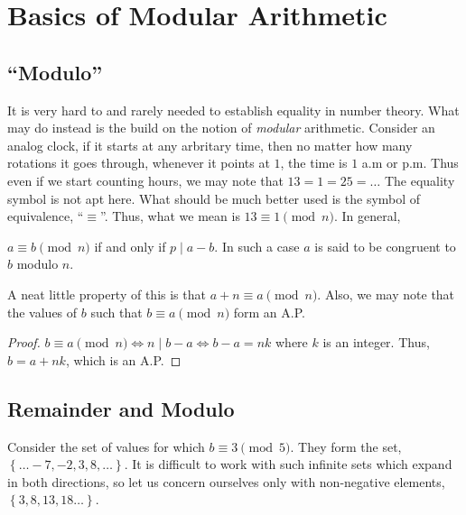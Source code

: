 \chapter{Basics of Modular Arithmetic}
\label{nt: modbasic}

\section{``Modulo''}

It is very hard to and rarely needed to establish equality in number theory. What may do instead
is the build on the notion of \emph{modular} arithmetic. Consider an analog clock, if it starts
at any arbritary time, then no matter how many rotations it goes through, whenever it points at 
\(1\), the time is \(1\) a.m or p.m. Thus even if we start counting hours, we may note that
\(13 = 1 = 25 = \dots\)                                                                                                                                                                                       
\parbreak
The equality symbol is not apt here. What should be much better used is the symbol of equivalence,
``\(\equiv\)''. Thus, what we mean is \(13 \equiv 1 \pmod{n}\). In general,

\begin{definition}
    [Congruent]
    \(a \equiv b \pmod{n}\) if and only if \(p \mid a - b\). In such a case \(a\) is said to be 
    congruent to \(b\) modulo \(n\).
\end{definition}

A neat little property of this is that \(a + n \equiv a \pmod{n}\). Also, we may note that
the values of \(b\) such that \(b \equiv a \pmod{n}\) form an A.P.

\begin{proof}
    \(b \equiv a \pmod{n} \iff n \mid b - a \iff b - a = nk\) where \(k\) is an integer. Thus,
    \(b = a + nk\), which is an A.P.
\end{proof}

\section{Remainder and Modulo}

Consider the set of values for which \(b \equiv 3 \pmod{5}\). They form the set, \(\left\{\dots
-7, -2, 3, 8, \dots \right\}\). It is difficult to work with such infinite sets which expand
in both directions, so let us concern ourselves only with non-negative elements, \(\left\{
3, 8, 13, 18 \dots \right\}\). 

